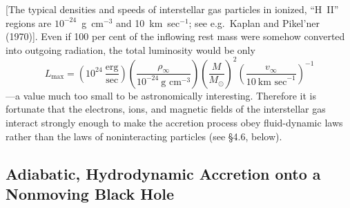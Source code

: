 [The typical densities and speeds of interstellar gas particles in ionized, ``H~II''
regions are $10^{-24}$~g~cm$^{-3}$ and 10~km~sec$^{-1}$; see e.g.\ Kaplan and Pikel'ner (1970)].
Even if 100 per cent of the inflowing rest mass were somehow converted into
outgoing radiation, the total luminosity would be only
%
\begin{equation}
L_\text{max} = \left(10^{24}~\frac{\text{erg}}{\text{sec}}\right) \left(\frac{\rho_\infty}{10^{-24}~\text{g~cm}^{-3}}\right) \left(\frac{M}{M_\odot}\right)^2 \left(\frac{v_\infty}{10~\text{km~sec}^{-1}}\right)^{-1}
\tag{4.1.4}
\end{equation}
%
---a value much too small to be astronomically interesting. Therefore it is fortunate
that the electrons, ions, and magnetic fields of the interstellar gas interact strongly
enough to make the accretion process obey fluid-dynamic laws rather than the
laws of noninteracting particles (see \S4.6, below).


\subsection{Adiabatic, Hydrodynamic Accretion onto a Nonmoving Black Hole}
\label{sec:4.2}

